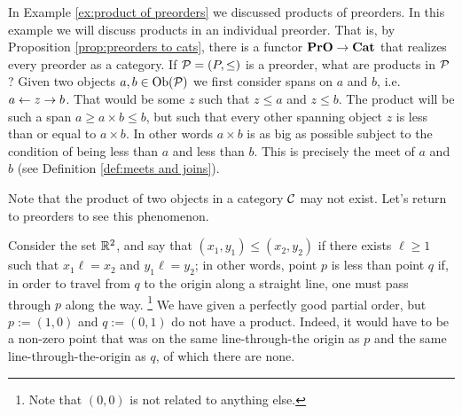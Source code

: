 \documentclass[CT4S-EN-RU]{subfiles}
\begin{document}
\begin{remarkRUS}\label{rem:gateway}
\end{remarkRUS}

\begin{exampleENG}
In Example \ref{ex:product of preorders} we discussed products of preorders. In this example we will discuss products in an individual preorder. That is, by Proposition \ref{prop:preorders to cats}, there is a functor ${\mathbf{PrO}}\rightarrow{\mathbf{Cat}}$ that realizes every preorder as a category. If $\mathcal{P}=(P,\leq)$ is a preorder, what are products in $\mathcal{P}$? Given two objects $a,b\in\textnormal{Ob}(\mathcal{P})$ we first consider spans on $a$ and $b$, i.e. $a\leftarrow z\rightarrow b$. That would be some $z$ such that $z\leq a$ and $z\leq b$. The product will be such a span $a\geq a\times b\leq b$, but such that every other spanning object $z$ is less than or equal to $a\times b$. In other words $a\times b$ is as big as possible subject to the condition of being less than $a$ and less than $b$. This is precisely the meet of $a$ and $b$ (see Definition \ref{def:meets and joins}). 
\end{exampleENG}

\begin{exampleRUS}
\end{exampleRUS}

\begin{exampleENG}\label{ex:products dont exist}
Note that the product of two objects in a category $\mathcal{C}$ may not exist. Let's return to preorders to see this phenomenon.

Consider the set ${\mathbb R}^2$, and say that $(x_1,y_1)\leq (x_2,y_2)$ if there exists $\ell\geq 1$ such that $x_1\ell=x_2$ and $y_1\ell=y_2$; in other words, point $p$ is less than point $q$ if, in order to travel from $q$ to the origin along a straight line, one must pass through $p$ along the way. 
\footnote{Note that $(0,0)$ is not related to anything else.} 
We have given a perfectly good partial order, but $p:=(1,0)$ and $q:=(0,1)$ do not have a product. Indeed, it would have to be a non-zero point that was on the same line-through-the origin as $p$ and the same line-through-the-origin as $q$, of which there are none.
\end{exampleENG}

\begin{exampleRUS}\label{ex:products dont exist}
\end{exampleRUS}
\end{document}
